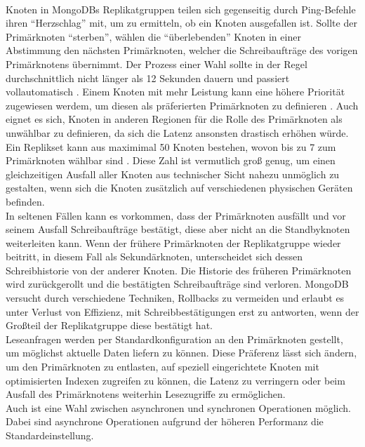 \paragraph{}
Knoten in MongoDBs Replikatgruppen teilen sich gegenseitig durch Ping-Befehle ihren \enquote{Herzschlag} mit, um zu ermitteln, ob ein Knoten ausgefallen ist.
Sollte der Primärknoten \enquote{sterben}, wählen die \enquote{überlebenden} Knoten in einer Abstimmung den nächsten Primärknoten, welcher die Schreibaufträge des vorigen Primärknotens übernimmt.
Der Prozess einer Wahl sollte in der Regel durchschnittlich nicht länger als 12 Sekunden dauern und passiert vollautomatisch \cite{db:mongoElectionTimeout}.
Einem Knoten mit mehr Leistung kann eine höhere Priorität zugewiesen werdem, um diesen als präferierten Primärknoten zu definieren \cite{db:mongoElectionPriority}.
Auch eignet es sich, Knoten in anderen Regionen für die Rolle des Primärknoten als unwählbar zu definieren, da sich die Latenz ansonsten drastisch erhöhen würde.
Ein Replikset kann aus maximimal 50 Knoten bestehen, wovon bis zu 7 zum Primärknoten wählbar sind \cite{db:mongoReplicaSetMembersLimit}.
Diese Zahl ist vermutlich groß genug, um einen gleichzeitigen Ausfall aller Knoten aus technischer Sicht nahezu unmöglich zu gestalten, wenn sich die Knoten zusätzlich auf verschiedenen physischen Geräten befinden.\\
In seltenen Fällen kann es vorkommen, dass der Primärknoten ausfällt und vor seinem Ausfall Schreibaufträge bestätigt, diese aber nicht an die Standbyknoten weiterleiten kann. Wenn der frühere Primärknoten der Replikatgruppe wieder beitritt, in diesem Fall als Sekundärknoten, unterscheidet sich dessen Schreibhistorie von der anderer Knoten. Die Historie des früheren Primärknoten wird zurückgerollt und die bestätigten Schreibaufträge sind verloren. 
MongoDB versucht durch verschiedene Techniken, Rollbacks zu vermeiden und erlaubt es unter Verlust von Effizienz, mit Schreibbestätigungen erst zu antworten, wenn der Großteil der Replikatgruppe diese bestätigt hat. \cite{db:mongoRollback}\\
Leseanfragen werden per Standardkonfiguration an den Primärknoten gestellt, um möglichst aktuelle Daten liefern zu können.
Diese Präferenz lässt sich ändern, um den Primärknoten zu entlasten, auf speziell eingerichtete Knoten mit optimisierten Indexen zugreifen zu können, die Latenz zu verringern oder beim Ausfall des Primärknotens weiterhin Lesezugriffe zu ermöglichen. \\
Auch ist eine Wahl zwischen asynchronen und synchronen Operationen möglich.
Dabei sind asynchrone Operationen aufgrund der höheren Performanz die Standardeinstellung.

